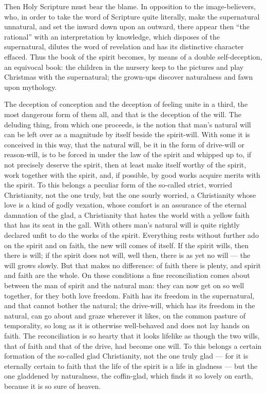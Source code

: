 \documentclass[12pt,a4paper,openany]{book}
\newcommand{\opage}[1]{\marginnote{\footnotesize\textit{[#1]}}}
\begin{document}
Then Holy Scripture must bear the blame. In opposition
to the image-believers, who, in order to take the word of Scripture quite
literally, make the supernatural unnatural, and set the
inward down upon an outward, there appear then ``the rational''
with an interpretation by knowledge, which disposes of the supernatural,
dilutes the word of revelation and has its distinctive
character effaced. Thus the book of the spirit becomes, by means of a
double self-deception, an equivocal book: the children in the nursery
keep to the pictures and play Christmas with the supernatural;
the grown-ups discover naturalness and fawn upon
mythology.

The deception of conception and the deception of feeling unite in a third,
the most dangerous form of them all, and that is the deception of the will.
The deluding thing, from which one proceeds, is the notion
that man's natural will can be left over as a
magnitude by itself beside the spirit-will. With some it is
conceived in this way, that the natural will, be it in
the form of drive-will or reason-will, is to be forced in
under the law of the spirit and whipped up to, if not precisely deserve
the spirit, then at least make itself worthy of the spirit,
work together with the spirit, and, if possible, by good
\setcounter{footnote}{0}%
\opage{61}works acquire merits with the spirit. To this
belongs a peculiar form of the so-called strict, worried
Christianity, not the one truly, but the one sourly worried,
a Christianity whose love is a kind of
godly vexation, whose comfort is an assurance of the eternal
damnation of the glad, a Christianity that hates the world with
a yellow faith that has its seat in the gall. With others
man's natural will is quite rightly declared
unfit to do the works of the spirit. Everything rests without
further ado on the spirit and on faith, the new will comes of
itself. If the spirit wills, then there is will; if the spirit does not will,
well then, there is as yet no will --- the will grows
slowly. But that makes no difference: of faith there is plenty,
and spirit and faith are the whole. On these conditions
a fine reconciliation comes about between the man of spirit
and the natural man: they can now get on so well together,
for they both love freedom. Faith has its freedom
in the supernatural, and that cannot bother the
natural; the drive-will, which has its freedom in the natural,
can go about and graze wherever it likes, on the common pasture of
temporality, so long as it is otherwise well-behaved and
does not lay hands on faith. The reconciliation is so hearty that
it looks lifelike as though the two wills, that of faith and that of
the drive, had become one will. To this belongs a certain
formation of the so-called glad Christianity, not the one
truly glad --- for it is eternally certain to faith that the life
of the spirit is a life in gladness --- but the one gladdened
by naturalness, the coffin-glad, which finds it so lovely on earth,
because it is so sure of heaven.
\end{document}
